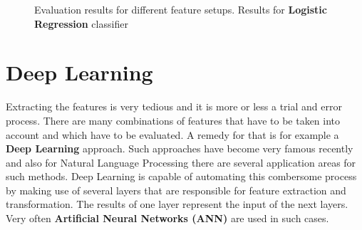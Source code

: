 \documentclass[journal, a4paper]{IEEEtran}
\begin{document}
\begin{figure}[!h]
	\begin{center}
		\caption{Evaluation results for different feature setups. Results for \textbf{Logistic Regression} classifier}
		\label{fig:results-logistic}
		\vspace{5mm}
	\end{center}
\end{figure}

\section{Deep Learning}

Extracting the features is very tedious and it is more or less a trial and error process. There are many combinations of features that have to be taken into account and which have to be evaluated. A remedy for that is for example a \textbf{Deep Learning} approach. Such approaches have become very famous recently and also for Natural Language Processing there are several application areas for such methods. Deep Learning is capable of automating this combersome process by making use of several layers that are responsible for feature extraction and transformation. The results of one layer represent the input of the next layers. Very often \textbf{Artificial Neural Networks (ANN)} are used in such cases.
\end{document}
